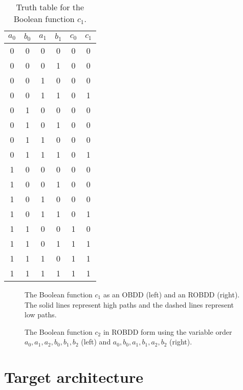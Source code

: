\documentclass[a4paper,11pt]{kth-mag}
\begin{document}
\begin{table}
\centering
\begin{tabular}{cccc|cc}
$a_0$ & $b_0$ & $a_1$ & $b_1$ & $c_0$ & $c_1$ \\
\hline
0     & 0     & 0     & 0     & 0     & 0 \\
0     & 0     & 0     & 1     & 0     & 0 \\
0     & 0     & 1     & 0     & 0     & 0 \\
0     & 0     & 1     & 1     & 0     & 1 \\
0     & 1     & 0     & 0     & 0     & 0 \\
0     & 1     & 0     & 1     & 0     & 0 \\
0     & 1     & 1     & 0     & 0     & 0 \\
0     & 1     & 1     & 1     & 0     & 1 \\
1     & 0     & 0     & 0     & 0     & 0 \\
1     & 0     & 0     & 1     & 0     & 0 \\
1     & 0     & 1     & 0     & 0     & 0 \\
1     & 0     & 1     & 1     & 0     & 1 \\
1     & 1     & 0     & 0     & 1     & 0 \\
1     & 1     & 0     & 1     & 1     & 1 \\
1     & 1     & 1     & 0     & 1     & 1 \\
1     & 1     & 1     & 1     & 1     & 1 \\
\end{tabular}
\caption{Truth table for the Boolean function $c_1$.}
\label{tab:tt_c1}
\end{table}

\begin{figure}[p]
\centering

\caption{The Boolean function $c_1$ as an OBDD (left) and an ROBDD (right). The solid lines represent high paths and the dashed lines represent low paths.}
\label{fig:bdd_c1}
\end{figure}

\begin{figure}[p]
\centering

\caption{The Boolean function $c_2$ in ROBDD form using the variable order $a_0,a_1,a_2,b_0,b_1,b_2$ (left) and $a_0,b_0,a_1,b_1,a_2,b_2$ (right).}
\label{fig:bdd_c2_bad}
\end{figure}

\chapter{Target architecture}
\label{ch:target_architecture}
\end{document}
